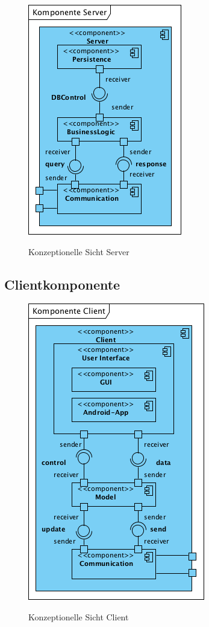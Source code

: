 \documentclass[fontsize=12pt,paper=a4,twoside]{scrartcl}
\begin{document}
\begin{figure} [H] 
\caption{Konzeptionelle Sicht Server}  \centering
	\includegraphics[scale=2]{Diagramme/KonzeptionelleSichtServer.png} 
	\label{pic:konzeptionellesichtserver} 
\end{figure}

\subsection{Clientkomponente}
\label{sec:client}

\begin{figure} [H] 
\caption{Konzeptionelle Sicht Client}  \centering
	\includegraphics[scale=2]{Diagramme/KonzeptionelleSichtClient.png} 
	\label{pic:konzeptionellesichtclient} 
\end{figure}
\end{document}
